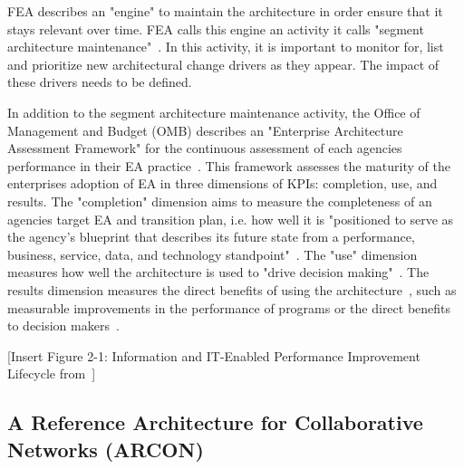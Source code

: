 FEA describes an "engine" to maintain the architecture in order ensure that it stays relevant over time. FEA calls this engine an activity it calls "segment architecture maintenance"~\cite{FederalEnterpriseArchitectureProgramManagementOffice}. In this activity, it is important to monitor for, list and prioritize new architectural change drivers as they appear. The impact of these drivers needs to be defined. 



In addition to the segment architecture maintenance activity, the Office of Management and Budget (OMB) describes an "Enterprise Architecture Assessment Framework" for the continuous assessment of each agencies performance in their EA practice~\cite{OfficeofManagementandBudget}. This framework assesses the maturity of the enterprises adoption of EA in three dimensions of KPIs: completion, use, and results. The "completion" dimension aims to measure the completeness of an agencies target EA and transition plan, i.e. how well it is "positioned to serve  as the agency's blueprint that describes its future state from a performance, business, service, data, and technology standpoint"~\cite{OfficeofManagementandBudget}. The "use" dimension measures how well the architecture is used to "drive decision making"~\cite{sessions2007}. The results dimension measures the direct benefits of using the architecture~\cite{sessions2007}, such as measurable improvements in the performance of programs or the direct benefits to decision makers~\cite{OfficeofManagementandBudget}. 

[Insert Figure 2-1: Information and IT-Enabled Performance Improvement Lifecycle from~\cite{OfficeofManagementandBudget}]
    

\subsection{A Reference Architecture for Collaborative Networks (ARCON)}








